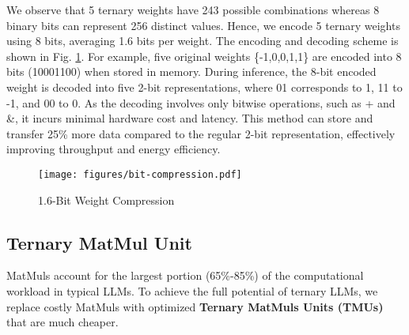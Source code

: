 We observe that 5 ternary weights have 243 possible combinations whereas 8 binary bits can represent 256 distinct values. Hence, we encode 5 ternary weights using 8 bits, averaging 1.6 bits per weight. The encoding and decoding scheme is shown in Fig. \ref{fig:bit-compression}. For example, five original weights \{-1,0,0,1,1\} are encoded into 8 bits (10001100) when stored in memory. During inference, the 8-bit encoded weight is decoded into five 2-bit representations, where 01 corresponds to 1, 11 to -1, and 00 to 0. As the decoding involves only bitwise operations, such as + and \&, it incurs minimal hardware cost and latency. This method can store and transfer 25\% more data compared to the regular 2-bit representation, effectively improving throughput and energy efficiency.
\begin{figure}
    \centering
    \vspace{-1mm}\texttt{[image: figures/bit-compression.pdf]}
    \caption{1.6-Bit Weight Compression}
    \label{fig:bit-compression}
    \vspace{-7mm}
\end{figure}


\subsection{Ternary MatMul Unit}
MatMuls account for the largest portion (65\%-85\%) of the computational workload\cite{high_perf} in typical LLMs. To achieve the full potential of ternary LLMs, we replace costly MatMuls with optimized \textbf{Ternary MatMuls Units (TMUs)} that are much cheaper. 

